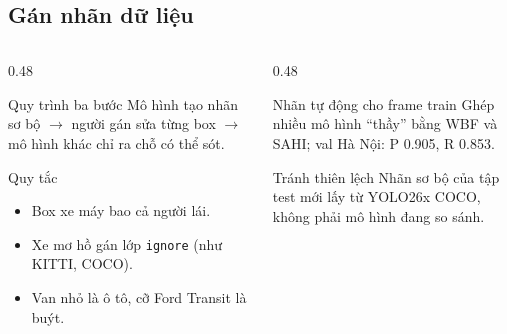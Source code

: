 \documentclass[aspectratio=\mlwAspectRatio, \mlwBaseSize, t]{beamer}
\begin{document}
\subsection{Gán nhãn dữ liệu}
\begin{frame}{\stitle}
  \begin{columns}[T]
    \begin{column}{0.48\textwidth}
      \begin{block}{Quy trình ba bước}
        Mô hình tạo nhãn sơ bộ $\rightarrow$ người gán sửa từng box $\rightarrow$ mô hình khác chỉ ra chỗ có thể sót.
      \end{block}
      \begin{block}{Quy tắc}
        \begin{itemize}
          \item Box xe máy bao cả người lái.
          \item Xe mơ hồ gán lớp \texttt{ignore} (như KITTI, COCO).
          \item Van nhỏ là ô tô, cỡ Ford Transit là buýt.
        \end{itemize}
      \end{block}
    \end{column}
    \begin{column}{0.48\textwidth}
      \begin{block}{Nhãn tự động cho frame train}
        Ghép nhiều mô hình ``thầy'' bằng WBF và SAHI; val Hà Nội: P 0.905,
        R 0.853.
      \end{block}
      \begin{block}{Tránh thiên lệch}
        Nhãn sơ bộ của tập test mới lấy từ YOLO26x COCO, \alert{không phải mô hình đang so sánh}.
      \end{block}
    \end{column}
  \end{columns}
\end{frame}
\end{document}
